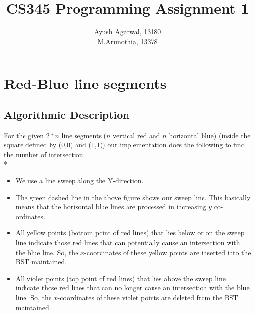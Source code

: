 \documentclass{article}
\title{CS345 Programming Assignment 1 \\ }
\author{\vspace{2mm} \large Ayush Agarwal, 13180 \\ M.Arunothia, 13378}
\date{}
\begin{document}
\maketitle
\section{Red-Blue line segments}
\subsection{Algorithmic Description}
For the given $2*n$ line segments ($n$ vertical red and $n$ horizontal blue) (inside the square defined by (0,0) and (1,1))  our implementation does the following to find the number of intersection. \\*
\begin{itemize}
\item We use a line sweep along the Y-direction.
\begin{center}
\end{center}
\item The green dashed line in the above figure shows our sweep line. This basically means that the horizontal blue lines are processed in increasing $y$ co-ordinates.
\item All yellow points (bottom point of red lines) that lies below or on the sweep line indicate those red lines that can potentially cause an intersection with the blue line. So, the $x$-coordinates of these yellow points are inserted into the BST maintained.
\item All violet points (top point of red lines) that lies above the sweep line indicate those red lines that can no longer cause an intersection with the blue line. So, the $x$-coordinates of these violet points are deleted from the BST maintained.

\end{itemize}
\end{document}
